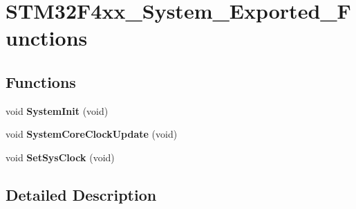 \hypertarget{group___s_t_m32_f4xx___system___exported___functions}{}\section{S\+T\+M32\+F4xx\+\_\+\+System\+\_\+\+Exported\+\_\+\+Functions}
\label{group___s_t_m32_f4xx___system___exported___functions}
\subsection*{Functions}
\begin{DoxyCompactItemize}
\item 
void {\bfseries System\+Init} (void)\hypertarget{group___s_t_m32_f4xx___system___exported___functions_ga93f514700ccf00d08dbdcff7f1224eb2}{}\label{group___s_t_m32_f4xx___system___exported___functions_ga93f514700ccf00d08dbdcff7f1224eb2}

\item 
void {\bfseries System\+Core\+Clock\+Update} (void)\hypertarget{group___s_t_m32_f4xx___system___exported___functions_gae0c36a9591fe6e9c45ecb21a794f0f0f}{}\label{group___s_t_m32_f4xx___system___exported___functions_gae0c36a9591fe6e9c45ecb21a794f0f0f}

\item 
void {\bfseries Set\+Sys\+Clock} (void)\hypertarget{group___s_t_m32_f4xx___system___exported___functions_ga32e8ef92fb7d8e24d780cf0635f3217e}{}\label{group___s_t_m32_f4xx___system___exported___functions_ga32e8ef92fb7d8e24d780cf0635f3217e}

\end{DoxyCompactItemize}


\subsection{Detailed Description}
